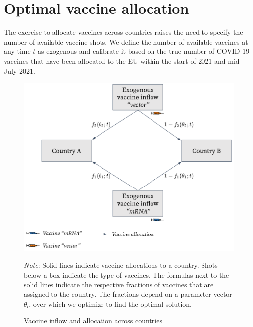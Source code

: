 \section{Optimal vaccine allocation}\label{sec:vaccine_allocation}
The exercise to allocate vaccines across countries raises the need to specify the number of available vaccine shots. We define the number of available vaccines at any time $t$ as exogenous and calibrate it based on the true number of COVID-19 vaccines that have been allocated to the EU within the start of 2021 and mid July 2021.
\begin{figure}[h!]
\centering
\includegraphics[scale=0.3]{images/overview_vaccine_inflow.png}\\
\begin{flushleft}
\scriptsize{\textit{Note}: Solid lines indicate vaccine allocations to a country. Shots below a box indicate the type of vaccines. The formulas next to the solid lines indicate the respective fractions of vaccines that are assigned to the country. The fractions depend on a parameter vector $\theta_l$, over which we optimize to find the optimal solution.}
\end{flushleft}
\caption{Vaccine inflow and allocation across countries}
\label{fig:model_vaccine_allocation}
\end{figure}

